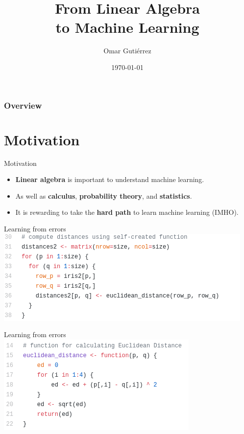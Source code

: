 \documentclass[handout]{beamer}
\title[\insertdate]{From Linear Algebra\\to Machine Learning}
\author{Omar Guti\'errez}
\institute{@trinogz}
\date{\today}
\begin{document}
\maketitle

\begin{frame}
    \frametitle{Overview}
    \tableofcontents
\end{frame}


\section{Motivation}
\begin{frame}{Motivation}
    \begin{itemize}
        \item \textbf{Linear algebra} is important to understand machine learning.
        \item As well as \textbf{calculus}, \textbf{probability theory}, and \textbf{statistics}.
        \item It is rewarding to take the \textbf{hard path} to learn machine learning (IMHO).
    \end{itemize}
\end{frame}


\begin{frame}{Learning from errors}
    \includegraphics[scale=0.555]{figures/naive_distance_matrix_r.png}
\end{frame}


\begin{frame}{Learning from errors}
    \includegraphics[scale=0.555]{figures/naive_euclidean_r.png}
\end{frame}
\end{document}
